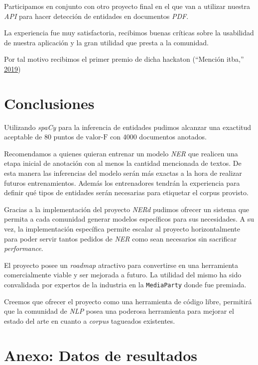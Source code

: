 \documentclass[12pt,a4paper,]{scrartcl}
\begin{document}
Participamos en conjunto con otro proyecto final en el que van a utilizar nuestra \emph{API} para hacer detección de entidades en documentos \emph{PDF}.

La experiencia fue muy satisfactoria, recibimos buenas críticas sobre la usabilidad de nuestra aplicación y la gran utilidad que presta a la comunidad.

Por tal motivo recibimos el primer premio de dicha hackaton (``Mención itba,'' \protect\hyperlink{ref-mediaparty2019_win}{2019})

\newpage

\hypertarget{conclusiones}{%
\section{Conclusiones}\label{conclusiones}}

Utilizando \emph{spaCy} para la inferencia de entidades pudimos alcanzar una exactitud aceptable de 80 puntos de \(\text{valor-F}\) con 4000 documentos anotados.

Recomendamos a quienes quieran entrenar un modelo \emph{NER} que realicen una etapa inicial de anotación con al menos la cantidad mencionada de textos. De esta manera las inferencias del modelo serán más exactas a la hora de realizar futuros entrenamientos. Además los entrenadores tendrán la experiencia para definir qué tipos de entidades serán necesarias para etiquetar el corpus provisto.

Gracias a la implementación del proyecto \emph{NERd} pudimos ofrecer un sistema que permita a cada comunidad generar modelos específicos para sus necesidades. A su vez, la implementación específica permite escalar al proyecto horizontalmente para poder servir tantos pedidos de \emph{NER} como sean necesarios sin sacrificar \emph{performance}.

El proyecto posee un \emph{roadmap} atractivo para convertirse en una herramienta comercialmente viable y ser mejorada a futuro. La utilidad del mismo ha sido convalidada por expertos de la industria en la \texttt{MediaParty} donde fue premiada.

Creemos que ofrecer el proyecto como una herramienta de código libre, permitirá que la comunidad de \emph{NLP} posea una poderosa herramienta para mejorar el estado del arte en cuanto a \emph{corpus} tagueados existentes.

\newpage

\hypertarget{anexo-datos-de-resultados}{%
\section*{Anexo: Datos de resultados}\label{anexo-datos-de-resultados}}
\end{document}
